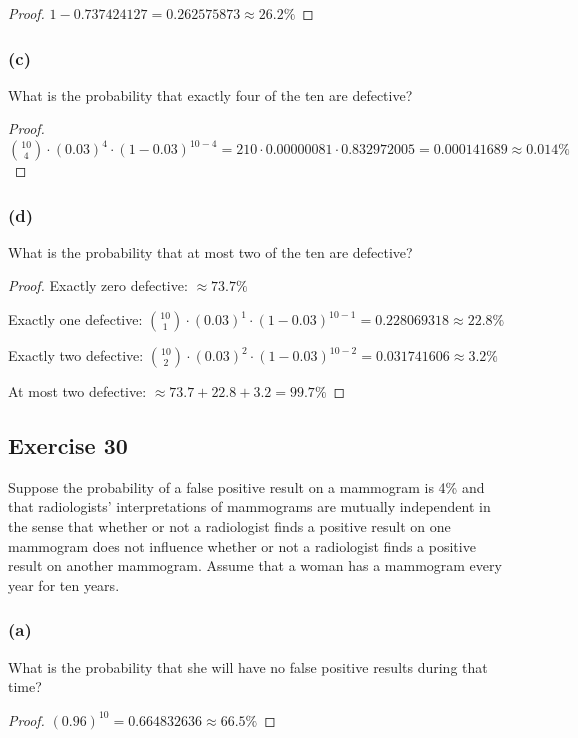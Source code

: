 \documentclass[14pt]{extarticle}
\begin{document}
\begin{proof}
\(1 - 0.737424127 = 0.262575873 \approx 26.2\%\)
\end{proof}

\subsubsection{(c)}
What is the probability that exactly four of the ten are defective?

\begin{proof}
\(\binom{10}{4} \cdot (0.03)^4 \cdot (1 - 0.03)^{10-4} = 210 \cdot 0.00000081 \cdot 0.832972005 = 0.000141689 \approx 
0.014\%\)
\end{proof}

\subsubsection{(d)}
What is the probability that at most two of the ten are defective?

\begin{proof}
Exactly zero defective: \(\approx 73.7\%\)

Exactly one defective: \(\binom{10}{1} \cdot (0.03)^1 \cdot (1 - 0.03)^{10-1} = 0.228069318 \approx 22.8\%\)

Exactly two defective: \(\binom{10}{2} \cdot (0.03)^2 \cdot (1 - 0.03)^{10-2} = 0.031741606 \approx 3.2\%\)

At most two defective: \(\approx 73.7+22.8+3.2 = 99.7\%\)
\end{proof}

\subsection{Exercise 30}
Suppose the probability of a false positive result on a mammogram is 4\% and that radiologists’ interpretations of 
mammograms are mutually independent in the sense that whether or not a radiologist finds a positive result on one mammogram 
does not influence whether or not a radiologist finds a positive result on another mammogram. Assume that a woman has 
a mammogram every year for ten years.

\subsubsection{(a)}
What is the probability that she will have no false positive results during that time?

\begin{proof}
\((0.96)^{10} = 0.664832636 \approx 66.5\%\)
\end{proof}
\end{document}
